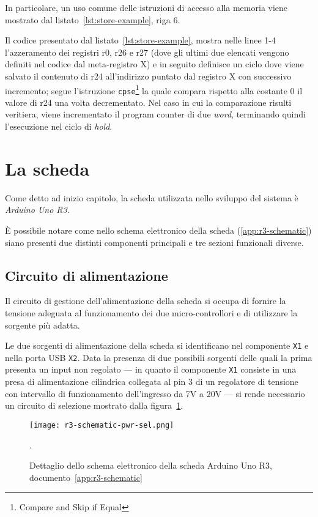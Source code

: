 In particolare, un uso comune delle istruzioni di accesso alla memoria viene mostrato dal listato~\ref{lst:store-example}, riga 6.


Il codice presentato dal listato~\ref{lst:store-example}, mostra nelle linee 1-4 l'azzeramento dei registri r0, r26 e r27 (dove gli ultimi due elencati vengono definiti nel codice dal meta-registro X) e in seguito definisce un ciclo dove viene salvato il contenuto di r24 all'indirizzo puntato dal registro X con successivo incremento; segue l'istruzione \texttt{cpse}\footnote{Compare and Skip if Equal} la quale compara rispetto alla costante 0 il valore di r24 una volta decrementato. Nel caso in cui la comparazione risulti veritiera, viene incrementato il program counter di due \textit{word}, terminando quindi l'esecuzione nel ciclo di \textit{hold}.

\section{La scheda}
Come detto ad inizio capitolo, la scheda utilizzata nello sviluppo del sistema è \textit{Arduino Uno R3}.

È possibile notare come nello schema elettronico della scheda (\ref{app:r3-schematic}) siano presenti due distinti componenti principali e tre sezioni funzionali diverse.

\subsection{Circuito di alimentazione}

Il circuito di gestione dell'alimentazione della scheda si occupa di fornire la tensione adeguata al funzionamento dei due micro-controllori e di utilizzare la sorgente più adatta.

Le due sorgenti di alimentazione della scheda si identificano nel componente \texttt{X1} e nella porta USB \texttt{X2}. Data la presenza di due possibili sorgenti delle quali la prima presenta un input non regolato --- in quanto il componente \texttt{X1} consiste in una presa di alimentazione cilindrica collegata al pin 3 di un regolatore di tensione con intervallo di funzionamento dell'ingresso da 7V a 20V\cite{onsemi:ncp111750} --- si rende necessario un circuito di selezione mostrato dalla figura~\ref{fig:r3-schematic-pwr-sel-detail}.

\begin{figure}[t]
    \centering
    \texttt{[image: r3-schematic-pwr-sel.png]}
    \caption[Dettaglio dello schema elettronico posto in appendice, documento~\ref{app:r3-schematic}]{Dettaglio dello schema elettronico della scheda Arduino Uno R3, documento~\ref{app:r3-schematic}~\cite{site:r3-schematic}}\label{fig:r3-schematic-pwr-sel-detail}.
\end{figure}

